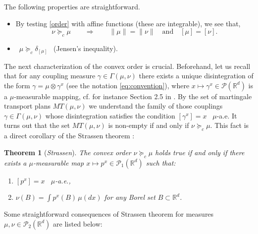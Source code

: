 \documentclass[11pt,letterpaper,reqno]{amsart}
\newtheorem{theorem}{Theorem}[section]
\theoremstyle{definition}
\numberwithin{equation}{section}
\newcommand{\R}{\mathbb{R}}
\newcommand{\Rd}{\R^d}
\newcommand{\PP}{\mathcal{P}}
\newcommand{\pairing}[1]{{\left \langle #1 \right \rangle}}
\begin{document}
The following  properties are straightforward.
\begin{itemize}

\item By testing \eqref{order}  with affine functions (these are integrable), we see  that,
  $$  \nu  \succeq_c \mu \qquad \Rightarrow  \qquad  \|\mu\| =\|\nu\| \quad \text{and} \quad [\mu]=[\nu] .$$
\item \  $\mu \succeq_c \delta_{[\mu]}$ \   (Jensen's inequality).
\end{itemize}

The next characterization of the convex order is crucial. Beforehand, let us recall that for any  coupling measure  $\gamma \in \Gamma(\mu,\nu)$ there exists a unique disintegration of the form $\gamma = \mu \otimes \gamma^x$ (see the notation \eqref{eq:convention}), where $x \mapsto \gamma^x \in \PP(\Rd)$ is a $\mu$-measurable  mapping, cf. for instance Section 2.5 in \cite{ambrosio2000}. By the set of martingale transport plans $MT(\mu,\nu) $ we understand the family of  those couplings $\gamma \in \Gamma(\mu,\nu)$
whose disintegration
satisfies the condition $[\gamma^x] = x$ \   $\mu$-a.e. It turns out that the set $MT(\mu,\nu)$ is non-empty if and only if $\nu  \succeq_c \mu$. This fact is a direct corollary of the Strassen theorem \cite{strassen1965}:


\begin{theorem}[\textit{Strassen}] The convex order
    $\nu  \succeq_c \mu$ holds true if and only if there exists a $\mu$-measurable map
 $x\mapsto p^x \in \PP_1(\R^d)$ such that:
 \begin{enumerate}[label={(\roman*)}] 
\item   $[p^x] = x$ \   $\mu$-a.e.,
\item  $\nu (B) = \int p^x(B)\, \mu(dx)$  for any Borel set $B\subset \R^d$. 
\end{enumerate}
\end{theorem}

 
 \noindent Some straightforward consequences of Strassen theorem for measures $\mu,\nu \in \PP_2(\R^d)$ are listed below:
 
\end{document}
